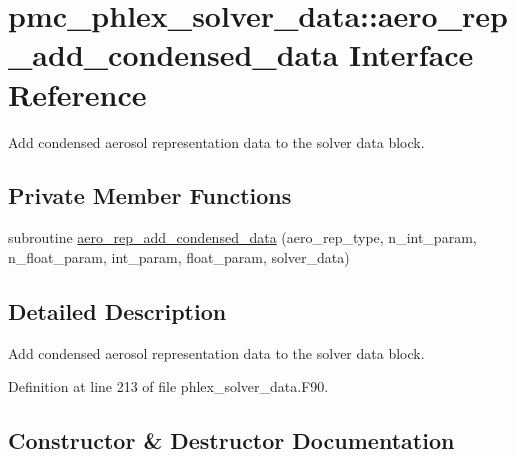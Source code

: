 \hypertarget{interfacepmc__phlex__solver__data_1_1aero__rep__add__condensed__data}{}\section{pmc\+\_\+phlex\+\_\+solver\+\_\+data\+:\+:aero\+\_\+rep\+\_\+add\+\_\+condensed\+\_\+data Interface Reference}
\label{interfacepmc__phlex__solver__data_1_1aero__rep__add__condensed__data}


Add condensed aerosol representation data to the solver data block.  


\subsection*{Private Member Functions}
\begin{DoxyCompactItemize}
\item 
subroutine \mbox{\hyperlink{interfacepmc__phlex__solver__data_1_1aero__rep__add__condensed__data_a4a489701776fda948c4c16dabed1e102}{aero\+\_\+rep\+\_\+add\+\_\+condensed\+\_\+data}} (aero\+\_\+rep\+\_\+type, n\+\_\+int\+\_\+param, n\+\_\+float\+\_\+param, int\+\_\+param, float\+\_\+param, solver\+\_\+data)
\end{DoxyCompactItemize}


\subsection{Detailed Description}
Add condensed aerosol representation data to the solver data block. 

Definition at line 213 of file phlex\+\_\+solver\+\_\+data.\+F90.



\subsection{Constructor \& Destructor Documentation}
\mbox{\label{interfacepmc__phlex__solver__data_1_1aero__rep__add__condensed__data_a4a489701776fda948c4c16dabed1e102}} 
